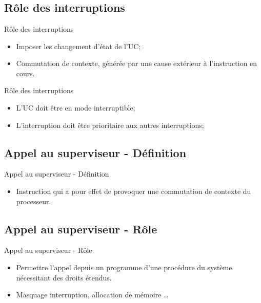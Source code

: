 \section{\sectitle}
\begin{frame}{\sectitle}
\def\subsectitle{Rôle des interruptions}
\subsection{\subsectitle}
\begin{block}{\subsectitle}
\begin{itemize}
    \item Imposer les changement d'état de l'UC;
    \item Commutation de contexte, générée par une cause extérieur à
    l'instruction en cours.
\end{itemize}
\end{block}

\begin{alertblock}{\subsectitle}
\begin{itemize}
    \item L'UC doit être en mode interruptible;
    \item L'interruption doit être prioritaire aux autres interruptions;
\end{itemize}
\end{alertblock}

\end{frame}

\begin{frame}{\sectitle}
\def\subsectitle{Appel au superviseur - Définition}
\subsection{\subsectitle}

\begin{exampleblock}{\subsectitle}
\begin{itemize}
    \item Instruction qui a pour effet de provoquer une commutation de contexte
    du processeur.
\end{itemize}
\end{exampleblock}

\def\subsectitle{Appel au superviseur - Rôle}
\subsection{\subsectitle}
\begin{block}{\subsectitle}
\begin{itemize}
    \item Permettre l'appel depuis un programme d'une procédure du système
    nécessitant des droits étendus.
    \item Masquage interruption, allocation de mémoire \dots
\end{itemize}
\end{block}
\end{frame}


